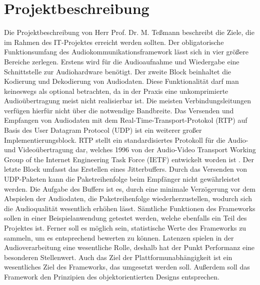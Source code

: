\section{Projektbeschreibung}
Die Projektbeschreibung von Herr Prof. Dr. M. Teßmann beschreibt die Ziele, die im Rahmen des IT-Projektes erreicht werden sollten. Der obligatorische Funktionsumfang des Audiokommunikationsframework lässt sich in vier größere Bereiche zerlegen. Erstens wird für die Audioaufnahme und Wiedergabe eine Schnittstelle zur Audiohardware benötigt. Der zweite Block beinhaltet die Kodierung und Dekodierung von Audiodaten. Diese Funktionalität darf man keineswegs als optional betrachten, da in der Praxis eine unkomprimierte Audioübertragung meist nicht realisierbar ist. Die meisten Verbindungsleitungen verfügen hierfür nicht über die notwendige Bandbreite. Das Versenden und Empfangen von Audiodaten mit dem Real-Time-Transport-Protokol (RTP) auf Basis des User Datagram Protocol (UDP) ist ein weiterer großer Implementierungsblock. RTP stellt ein standardisiertes Protokoll für die Audio- und Videoübertragung dar, welches 1996 von der Audio-Video Transport Working Group of the Internet Engineering Task Force (IETF) entwickelt worden ist \cite{RFC3550}. Der letzte Block umfasst das Erstellen eines Jitterbuffers. Durch das Versenden von UDP-Paketen kann die Paketreihenfolge beim Empfänger nicht gewährleistet werden. Die Aufgabe des Buffers ist es, durch eine minimale Verzögerung vor dem Abspielen der Audiodaten, die Paketreihenfolge wiederherzustellen, wodurch sich die Audioqualität wesentlich erhöhen lässt. Sämtliche Funktionen des Frameworks sollen in einer Beispielanwendung getestet werden, welche ebenfalls ein Teil des Projektes ist. Ferner soll es möglich sein, statistische Werte des Frameworks zu sammeln, um es entsprechend bewerten zu können. Latenzen spielen in der Audioverarbeitung eine wesentliche Rolle, deshalb hat der Punkt Performanz eine besonderen Stellenwert. Auch das Ziel der Plattformunabhängigkeit ist ein wesentliches Ziel des Frameworks, das umgesetzt werden soll. Außerdem soll das Framework den Prinzipien des objektorientierten Designs entsprechen.
	
